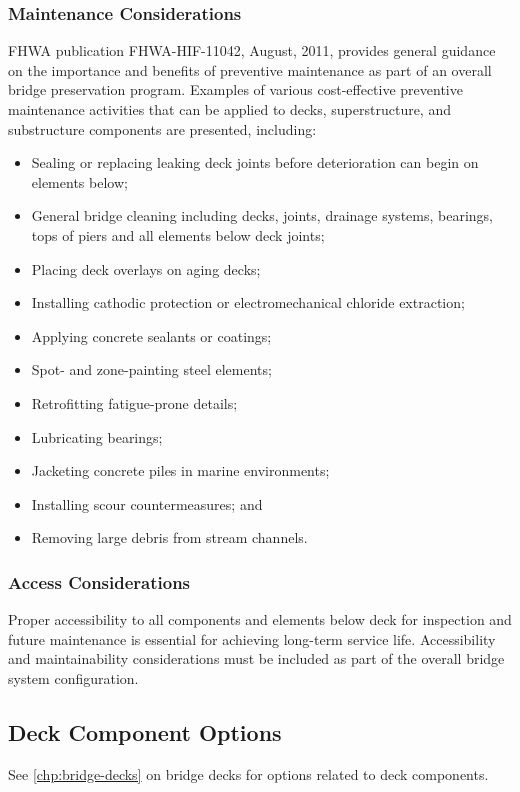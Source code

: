 \subsubsection{Maintenance Considerations}
FHWA publication FHWA-HIF-11042, August, 2011, provides general guidance on the importance and benefits
of preventive maintenance as part of an overall bridge preservation program. Examples of various cost-effective
preventive maintenance activities that can be applied to decks, superstructure, and substructure components are
presented, including:
\begin{itemize}
  \item Sealing or replacing leaking deck joints before deterioration can begin on elements below;
  \item General bridge cleaning including decks, joints, drainage systems, bearings, tops of piers and all elements
  below deck joints;
  \item  Placing deck overlays on aging decks;
  \item Installing cathodic protection or electromechanical chloride extraction;
  \item Applying concrete sealants or coatings;
  \item Spot- and zone-painting steel elements;
  \item  Retrofitting fatigue-prone details;
  \item Lubricating bearings;
  \item Jacketing concrete piles in marine environments;
  \item Installing scour countermeasures; and
  \item Removing large debris from stream channels.
\end{itemize}

\subsubsection{Access Considerations}
Proper accessibility to all components and elements below deck for inspection and future maintenance is
essential for achieving long-term service life. Accessibility and maintainability considerations must be included as
part of the overall bridge system configuration.

\subsection{Deck Component Options}
See \cref{chp:bridge-decks} on bridge decks for options related to deck components.

